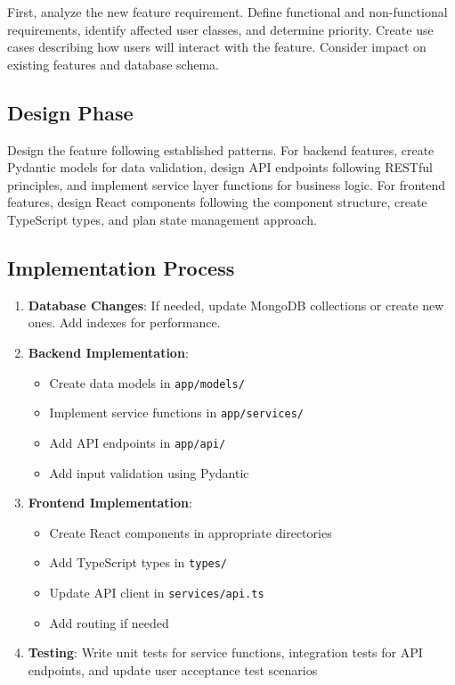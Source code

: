 \documentclass[12pt,a4paper]{report}
\begin{document}
First, analyze the new feature requirement. Define functional and non-functional requirements, identify affected user classes, and determine priority. Create use cases describing how users will interact with the feature. Consider impact on existing features and database schema.

\subsection{Design Phase}

Design the feature following established patterns. For backend features, create Pydantic models for data validation, design API endpoints following RESTful principles, and implement service layer functions for business logic. For frontend features, design React components following the component structure, create TypeScript types, and plan state management approach.

\subsection{Implementation Process}

\begin{enumerate}
    \item \textbf{Database Changes}: If needed, update MongoDB collections or create new ones. Add indexes for performance.
    \item \textbf{Backend Implementation}:
          \begin{itemize}
              \item Create data models in \texttt{app/models/}
              \item Implement service functions in \texttt{app/services/}
              \item Add API endpoints in \texttt{app/api/}
              \item Add input validation using Pydantic
          \end{itemize}
    \item \textbf{Frontend Implementation}:
          \begin{itemize}
              \item Create React components in appropriate directories
              \item Add TypeScript types in \texttt{types/}
              \item Update API client in \texttt{services/api.ts}
              \item Add routing if needed
          \end{itemize}
    \item \textbf{Testing}: Write unit tests for service functions, integration tests for API endpoints, and update user acceptance test scenarios
\end{enumerate}
\end{document}
